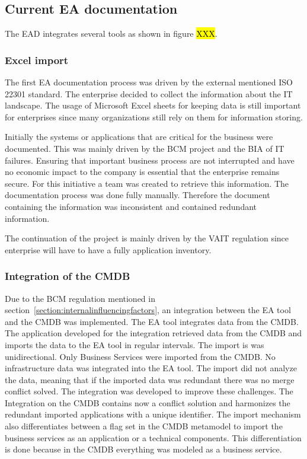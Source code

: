 \subsection{Current EA documentation}\label{subsection:currentead}

The EAD integrates several tools as shown in figure \hl{XXX}. 

\subsubsection{Excel import}

The first EA documentation process was driven by the external mentioned ISO 22301 standard. The enterprise decided to collect the information about the IT landscape. The usage of Microsoft Excel sheets for keeping data is still important for enterprises since many organizations still rely on them for information storing.\hl{}

Initially the systems or applications that are critical for the business were documented. This was mainly driven by the BCM project and the BIA of IT failures. Ensuring that important business process are not interrupted and have no economic impact to the company is essential that the enterprise remains secure. For this initiative a team was created to retrieve this information. The documentation process was done fully manually. Therefore the document containing the information was inconsistent and contained redundant information.

The continuation of the project is mainly driven by the VAIT regulation since enterprise will have to have a fully application inventory.

\subsubsection{Integration of the CMDB}
Due to the BCM regulation mentioned in section~\ref{section:internalinfluencingfactors}, an integration between the EA tool and the CMDB was implemented. The EA tool integrates data from the CMDB. The application developed for the integration retrieved data from the CMDB and imports the data to the EA tool in regular intervals. The import is was unidirectional. Only Business Services were imported from the CMDB. No infrastructure data was integrated into the EA tool. The import did not analyze the data, meaning that if the imported data was redundant there was no merge conflict solved. The integration was developed to improve these challenges. The Integration on the CMDB contains now a conflict solution and harmonizes the redundant imported applications with a unique identifier. The import mechanism also differentiates between a flag set in the CMDB metamodel to import the business services as an application or a technical components. This differentiation is done because in the CMDB everything was modeled as a business service.

